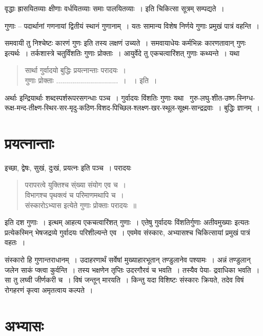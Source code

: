 {वृद्धाः ह्रासयितव्याः क्षीणाः वर्धयितव्याः समाः पालयितव्याः~। इति चिकित्सा सूत्रम् सम्पद्यते~। 

गुणाः – पदार्थानां गणनायां द्वितीयं स्थानं गुणानाम्~। यतः सामान्य विशेष निर्णये गुणाः प्रमुखं पात्रं वहन्ति~। 


समवायी तु निश्चेष्टः कारणं गुणः इति तस्य लक्षणं उच्यते~। समवायाधेयः कर्मभिन्नः कारणतावान् गुणः इत्यर्थः~। तर्कशास्त्रे चतुर्विंशतिः गुणाः प्रोक्ताः~। आयुर्वेदे तु एकचत्वारिंशत् गुणाः कथ्यन्ते~। यथा

\begin{verse}
सार्था गुर्वादयो बुद्धिः प्रयत्नान्ताः परादयः~। \\
गुणाः प्रोक्ताः ...............................~। ~। इति~। 
\end{verse}
अर्थाः इन्द्रियार्थाः शब्दस्पर्शरूपरसगन्धाः पञ्च~। गुर्वादयः विंशतिः गुणाः यथा \ गुरु-लघु-शीत-उष्ण-स्निग्ध- रूक्ष-मन्द-तीक्ष्ण-स्थिर-सर-मृदु-कठिण-विशद-पिच्छिल-श्लक्ष्ण-खर-स्थूल-सूक्ष्म-सान्द्रद्रवाः~। बुद्धिः ज्ञानम्~। 

\section*{प्रयत्नान्ताः}

इच्छा, द्वेषः, सुखं, दुःखं, प्रयत्नः इति पञ्च~। परादयः

\begin{verse}
परापरत्वे युक्तिश्च स्ंख्या संयोग एव च~। \\
विभागश्च पृथक्त्वं च परिमाणमथापि च~। \\
संस्कारोऽभ्यास इत्येते गुणाः प्रोक्ताः परादयः~॥
\end{verse}
इति दश गुणाः~। इत्थम् आहत्य एकचत्वारिंशत् गुणाः~। एतेषु गुर्वादयः विंशतिर्गुणाः अतीवमुख्याः इत्यतः प्रत्येकस्मिन् भेषजद्रव्ये गुर्वादयः परिशील्यन्ते एव~। एवमेव संस्कारः, अभ्यासश्च चिकित्सायां प्रमुखं पात्रं वहतः~। 

संस्कारो हि गुणान्तराधानम्~। उदाहरणार्थं सर्वेषां मुख्याहारभूतान् तण्डुलानेव पश्यामः~। अन्नं तण्डुलान् जलेन साकं प्क्त्वा कुर्वन्ति~। तस्य भक्षणेन तृप्तिः उदरगौरवं च भवति~। तस्यैव पेया-  द्रवाधिका भवति~। सा तु लघ्वी जीर्णकरी च~। विषं जन्तून् मारयति~। किन्तु यदा विशिष्टः संस्कारः क्रियते, तदेव विषं रोगहरणं कृत्वा अमृतत्वाय कल्पते~। 

\section*{अभ्यासः}

}
